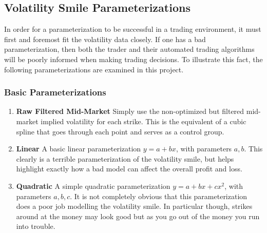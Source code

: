 \documentclass[12pt, a4paper, notitlepage]{article}
\numberwithin{equation}{subsection}
\numberwithin{figure}{subsection}
\numberwithin{table}{subsection}
\begin{document}
\subsection{Volatility Smile Parameterizations}\label{sec:VolSmileParameterizations}
In order for a parameterization to be successful in a trading environment, it must first and foremost fit the volatility data closely.  If one has a bad parameterization, then both the trader and their automated trading algorithms will be poorly informed when making trading decisions.  To illustrate this fact, the following parameterizations are examined in this project.

\subsubsection{Basic Parameterizations}\label{subsec:BasicParameterizations}
\begin{enumerate}
	\item \textbf{Raw Filtered Mid-Market}
    \newline Simply use the non-optimized but filtered mid-market implied volatility for each strike.  This is the equivalent of a cubic spline that goes through each point and serves as a control group.
    \item \textbf{Linear} 
    \newline A basic linear parameterization $y = a + bx$, with parameters $a,b$.  This clearly is a terrible parameterization of the volatility smile, but helps highlight exactly how a bad model can affect the overall profit and loss.
    \item \textbf{Quadratic}
    \newline A simple quadratic parameterization $y = a + bx + cx^2$, with parameters $a,b,c$.  It is not completely obvious that this parameterization does a poor job modelling the volatility smile.  In particular though, strikes around at the money may look good but as you go out of the money you run into trouble.
\end{enumerate}
\end{document}
